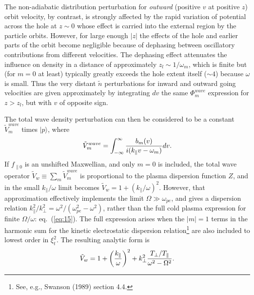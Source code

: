 \documentclass[12pt]{article}
\def\ket#1{|#1\rangle}
\begin{document}
The non-adiabatic distribution perturbation for \emph{outward}
(positive $v$ at positive $z$) orbit velocity, by contrast, is
strongly affected by the rapid variation of potential across the hole
at $z\sim 0$ whose effect is carried into the external region by the
particle orbits. However, for large enough $|z|$ the effects of the
hole and earlier parts of the orbit become negligible because of
dephasing between oscillatory contributions from different
velocities. The dephasing effect attenuates the influence on density
in a distance of approximately $z_l\sim 1/\omega_m$, which is finite
but (for $m=0$ at least) typically greatly exceeds the hole extent
itself ($\sim 4$) because $\omega$ is small.  Thus the very distant
$\tilde n$ perturbations for inward and outward going velocities are
given approximately by integrating $dv$ the same $\Phi_m^{wave}$
expression for $z>z_l$, but with $v$ of opposite sign.

The total wave density perturbation can then be considered to be a
constant $\tilde V_m^{wave}$ times $\ket{p}$, where
\begin{equation}
  \label{vmwave}
  \tilde V_m^{wave}= \int_{-\infty}^\infty { b_m(v) \over
    i(k_\parallel v-\omega_m)} dv.
\end{equation}
If $f_{\parallel0}$ is an unshifted Maxwellian, and only $m=0$ is
included, the total wave operator $\tilde V_w\equiv \sum_m\tilde
V_m^{wave}$ is proportional to the plasma dispersion function $Z$, and
in the small $k_\parallel/\omega$ limit becomes $\tilde V_w=1+(k_\parallel/\omega)^2$.
However, that approximation effectively implements the limit
$\Omega\gg \omega_{pe}$, and gives a dispersion relation
$k_\parallel^2/k_\perp^2 = \omega^2/(\omega_{pe}^2-\omega^2)$, rather
than the full cold plasma expression for finite $\Omega/\omega$: eq.\
(\ref{eq:15}). The full expression arises when the $|m|=1$ terms in
the harmonic sum for the kinetic electrostatic dispersion
relation\footnote{See, e.g., Swanson (1989) section 4.4.} are also
included to lowest order in $\xi_t^2$. The resulting analytic form is
\begin{equation}
  \label{eq:24}
  \tilde V_w= 1 + \left(k_\parallel\over\omega\right)^2 +
  k_\perp^2 {T_\perp/T_\parallel\over\omega^2-\Omega^2}.
\end{equation}
\end{document}

